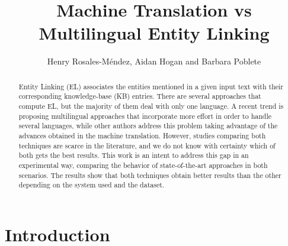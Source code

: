 \documentclass{llncs}
\begin{document}
\title{Machine Translation vs Multilingual Entity Linking}
%
%
\author{Henry Rosales-M\'endez, Aidan Hogan and Barbara Poblete}
%
%
%

\maketitle              %
\begin{abstract}
Entity Linking (EL) associates the entities mentioned in a given input text with their corresponding knowledge-base (KB) entries. There are several approaches that compute EL, but the majority of them deal with only one language. A recent trend is proposing multilingual approaches that incorporate more effort in order to handle several languages, while other authors address this problem taking advantage of the advances obtained in the machine translation. However, studies comparing both techniques are scarce in the literature, and we do not know with certainty which of both gets the best results. 
This work is an intent to address this gap in an experimental way, comparing the behavior of state-of-the-art approaches in both scenarios. The results show that both techniques obtain better results than the other depending on the system used and the dataset.
\end{abstract}




\section{Introduction}
\label{sec:intro}
\end{document}
